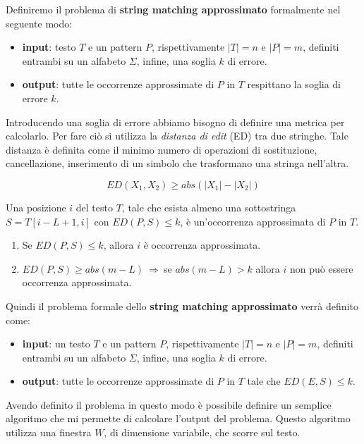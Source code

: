 Definiremo il problema di \textbf{string matching approssimato} formalmente nel seguente modo:
\begin{itemize}
    \item \textbf{input}: testo $T$ e un pattern $P$, rispettivamente $|T|=n$ e $|P|=m$, definiti entrambi su un alfabeto $\Sigma$, infine, una soglia $k$ di errore. 
    \item \textbf{output}: tutte le occorrenze approssimate di $P$ in $T$ respittano la soglia di errore $k$.
\end{itemize}
Introducendo una soglia di errore abbiamo bisogno di definire una metrica per calcolarlo. Per fare ciò si utilizza la \textit{distanza di edit} (ED) tra due stringhe. Tale distanza è definita come il minimo numero di operazioni di sostituzione, cancellazione, inserimento di un simbolo che trasformano una stringa nell'altra.
\begin{nota}
    \begin{equation}
        ED(X_1, X_2) \geq abs(|X_1| - |X_2|)
    \end{equation}
\end{nota}
\begin{definizione}
    Una posizione $i$ del testo $T$, tale che esista almeno una sottostringa $S = T[i - L + 1,i]$ con $ED(P, S) \leq k$, è un'occorrenza approssimata di $P$ in $T$.
\end{definizione}
\begin{nota}
    \begin{enumerate}
        \item Se $ED(P, S) \leq k$, allora $i$ è occorrenza approssimata.
        \item $ED(P, S) \geq abs(m - L) \ \Rightarrow \ $se $abs(m - L) > k$
              allora $i$ non può essere occorrenza approssimata.
    \end{enumerate}
\end{nota}
Quindi il problema formale dello \textbf{string matching approssimato} verrà definito come:
\begin{itemize}
	\item \textbf{input}: un testo $T$ e un pattern $P$, rispettivamente $|T|=n$ e $|P|=m$, definiti entrambi su un alfabeto $\Sigma$, infine, una soglia $k$ di errore. 
	\item \textbf{output}: tutte le occorrenze approssimate di $P$ in $T$ tale che  $ED(E,S)\le k$.
\end{itemize}
Avendo definito il problema in questo modo è possibile definire un semplice algoritmo che mi permette di calcolare l'output del problema. Questo algoritmo utilizza una finestra $W$, di dimensione variabile, che scorre sul testo.

